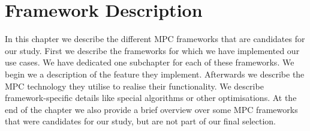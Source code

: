 \label{Framework Desciption}	
\chapter{Framework Description}
In this chapter we describe the different MPC frameworks that are candidates for our study. First we describe the frameworks for which we have implemented our use cases. We have dedicated one subchapter for each of these frameworks.
We begin we a description of the feature they implement. Afterwards we describe the MPC technology they utilise to realise their functionality. We describe framework-specific details like special algorithms or other optimisations. At the end of the chapter we also provide a brief overview over some MPC frameworks that were candidates for our study, but are not part of our final selection.

